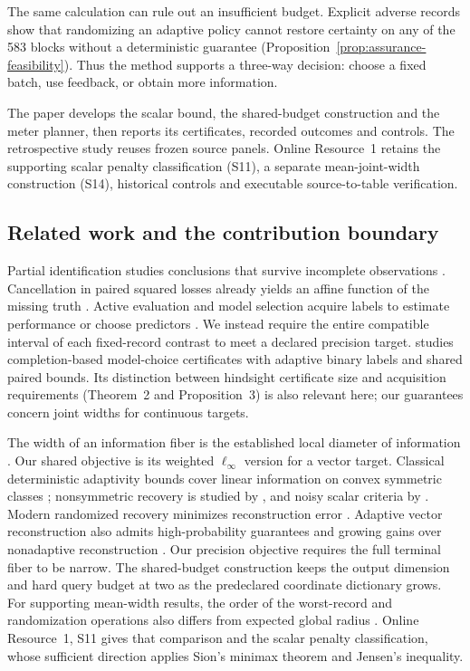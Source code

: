 \documentclass[12pt]{article}
\begin{document}
The same calculation can rule out an insufficient budget. Explicit adverse
records show that randomizing an adaptive policy cannot restore certainty
on any of the 583 blocks without a deterministic guarantee
(Proposition~\ref{prop:assurance-feasibility}). Thus the method supports a
three-way decision: choose a fixed batch, use feedback, or obtain more
information.

The paper develops the scalar bound, the shared-budget construction and the
meter planner, then reports its certificates, recorded outcomes and controls.
The retrospective study reuses frozen source panels. Online Resource~1
retains the supporting scalar penalty classification (S11), a separate
mean-joint-width construction (S14), historical controls and executable
source-to-table verification.

\subsection{Related work and the contribution boundary}
Partial identification studies conclusions that survive incomplete
observations \citep{manski,polo}. Cancellation in paired squared losses
already yields an affine function of the missing truth \citep{patton}.
Active evaluation and model selection acquire labels to estimate performance
or choose predictors \citep{sawade,hara,active,okanovic2025}. We instead
require the entire compatible interval of each fixed-record contrast to
meet a declared precision target. \citet[Theorem~1 and Proposition~1]{kuboyama2026}
studies completion-based model-choice certificates with adaptive binary
labels and shared paired bounds. Its distinction between hindsight certificate
size and acquisition requirements (Theorem~2 and Proposition~3) is also
relevant here; our guarantees concern joint widths for continuous targets.

The width of an information fiber is the established local diameter of
information \citep[Section~4.1]{novak2008}. Our shared objective is its
weighted $\ell_\infty$ version for a vector target. Classical deterministic
adaptivity bounds cover linear information on convex symmetric classes
\citep[Theorems~4.4--4.5]{novak2008}; nonsymmetric recovery is studied by
\citet{novak1995}, and noisy scalar criteria by
\citet[Theorems~2--3 and~5]{osipenko}. Modern randomized recovery minimizes
reconstruction error \citep[Section~2 and Proposition~4.1]{krieg2025}
\citep[Section~9.1, Eq.~(9.15), author manuscript v2]{krieg2026}.
Adaptive vector reconstruction also admits high-probability guarantees and
growing gains over nonadaptive reconstruction
\citep[Theorems~3.1 and~4.1, author manuscript v1]{kunsch2026}.
Our precision objective requires the full terminal fiber to be narrow.
The shared-budget construction keeps the output dimension and hard query
budget at two as the predeclared coordinate dictionary grows.
For supporting mean-width results, the order of the
worst-record and randomization operations also differs from expected global
radius \citep[Eq.~(2.4), Remark~6.1, author manuscript v2]{krieg2026}.
Online Resource~1, S11 gives that comparison and the scalar penalty
classification, whose sufficient direction applies Sion's minimax theorem
\citep[Theorem~3.4]{sion1958} and Jensen's inequality.
\end{document}
